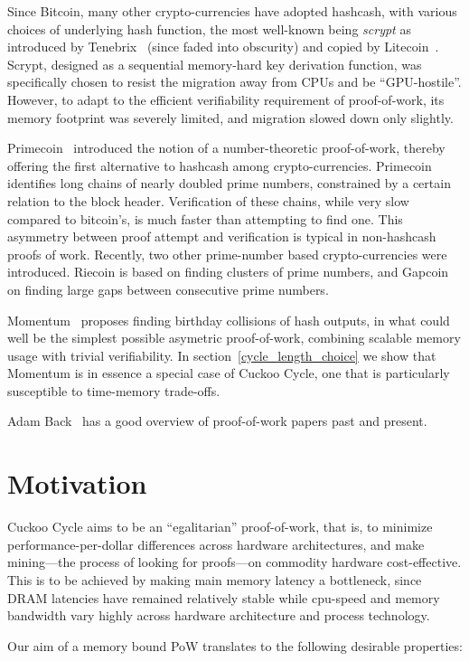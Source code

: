 \documentclass[11pt, oneside]{article}
\begin{document}
Since Bitcoin, many other crypto-currencies have adopted hashcash, with various
choices of underlying hash function, the most well-known being {\em scrypt} as
introduced by Tenebrix~\cite{tenebrix2011} (since faded into obscurity)
and copied by Litecoin~\cite{litecoin2011}.
Scrypt, designed as a sequential memory-hard key derivation function,
was specifically chosen to resist the migration away from CPUs and be ``GPU-hostile''.
However, to adapt to the efficient verifiability requirement of proof-of-work, its
memory footprint was severely limited, and migration slowed down only slightly.

Primecoin~\cite{king2013} introduced the notion of a number-theoretic proof-of-work,
thereby offering the first alternative to hashcash among crypto-currencies.
Primecoin identifies long chains of nearly doubled prime numbers, constrained
by a certain relation to the block header.
Verification of these chains, while very slow compared to bitcoin's, is much faster
than attempting to find one.
This asymmetry between proof attempt and verification is typical in non-hashcash proofs of work.
Recently, two other prime-number based crypto-currencies were introduced. Riecoin is based
on finding clusters of prime numbers, and Gapcoin on finding large gaps between consecutive prime numbers.

Momentum~\cite{larimer2013} proposes finding birthday collisions of hash outputs,
in what could well be the simplest possible asymetric proof-of-work,
combining scalable memory usage with trivial verifiability.
In section~\ref{cycle_length_choice} we show that Momentum is in essence a special case of Cuckoo Cycle,
one that is particularly susceptible to time-memory trade-offs.

Adam Back~\cite{back2014} has a good overview of proof-of-work papers past and present.

\section{Motivation}
Cuckoo Cycle aims to be an ``egalitarian'' proof-of-work, that is,
to minimize performance-per-dollar differences across hardware architectures,
and make mining---the process of looking for proofs---on commodity hardware cost-effective.
This is to be achieved by making main memory latency a bottleneck, since
DRAM latencies have remained relatively stable while cpu-speed and memory bandwidth vary highly
across hardware architecture and process technology.

Our aim of a memory bound PoW translates to the following desirable properties:
\end{document}
